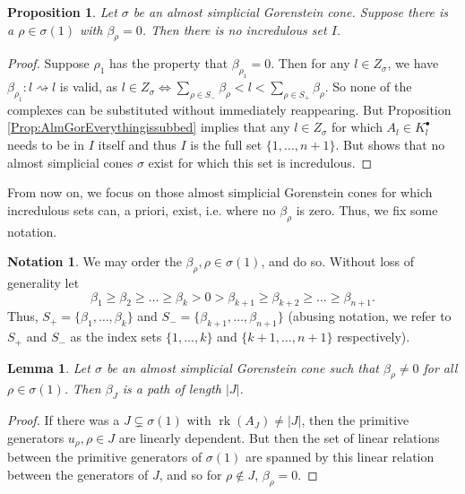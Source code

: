 \documentclass[reqno, 12pt]{amsart}
\newtheorem{lemma}[theorem]{Lemma}
\newtheorem{proposition}[theorem]{Proposition}
\theoremstyle{definition}
\newtheorem{notation}[theorem]{Notation}
\numberwithin{equation}{section}
\begin{document}
\begin{proposition}
    \label{Prop:AlmGor0isbad}
    Let $\sigma$ be an almost simplicial Gorenstein cone. Suppose there is a $\rho\in \sigma(1)$ with $\beta_\rho=0$. Then there is no incredulous set $I$.
\end{proposition}

\begin{proof}
    Suppose $\rho_1$ has the property that $\beta_{\rho_1}=0$. Then for any $l\in Z_\sigma$, we have $\beta_{\rho_1}:l\rightsquigarrow l$ is valid, as $l\in Z_\sigma\Leftrightarrow \sum_{\rho\in S_-}\beta_\rho <l<\sum_{\rho\in S_+}\beta_\rho$. So none of the complexes can be substituted without immediately reappearing. But Proposition \ref{Prop:AlmGorEverythingissubbed} implies that any $l\in Z_\sigma$ for which $A_l\in K_l^\bullet$ needs to be in $I$ itself and thus $I$ is the full set $\{1,\dots,n+1\}$. But \cite[Proposition 7.9]{FMS19} shows that no almost simplicial cones $\sigma$ exist for which this set is incredulous.
\end{proof} 

 From now on, we focus on those almost simplicial Gorenstein cones for which incredulous sets can, a priori, exist, i.e. where no $\beta_\rho$ is zero. Thus, we fix some notation.
\begin{notation}
We may order the $\beta_\rho, \rho\in \sigma(1)$, and do so. Without loss of generality let \[\beta_1\ge \beta_2\ge\dots\ge\beta_k >0>\beta_{k+1}\ge \beta_{k+2}\geq\dots\geq \beta_{n+1}.\]
Thus, $S_+=\{\beta_1,\dots,\beta_k\}$ and $S_-=\{\beta_{k+1},\dots,\beta_{n+1}\}$ (abusing notation, we refer to $S_+$ and $S_-$ as the index sets $\{1,\dots,k\}$ and $\{k+1,\dots,n+1\}$ respectively).
\end{notation}



\begin{lemma}
    \label{Lem:AlmGorPathLength}
    Let $\sigma$ be an almost simplicial Gorenstein cone such that $\beta_\rho\neq 0$ for all $\rho\in \sigma(1)$. Then $\beta_J$ is a path of length $|J|$.
\end{lemma}
\begin{proof}
    If there was a $J\subsetneq \sigma(1)$ with $\operatorname{rk}(A_J)\neq |J|$, then the primitive generators $u_\rho, \rho\in J$ are linearly dependent. But then the set of linear relations between the primitive generators of $\sigma(1)$ are spanned by this linear relation between the generators of $J$, and so for $\rho\not\in J$, $\beta_\rho=0$.
\end{proof}
\end{document}
